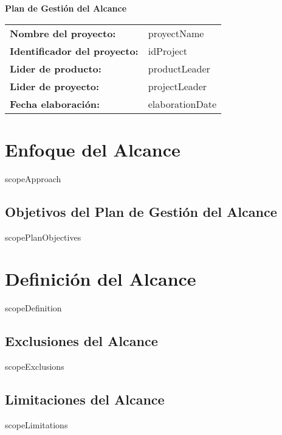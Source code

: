 \documentclass{article}
\begin{document}
    \begin{center}
    {\huge\textbf{Plan de Gestión del Alcance}}\\[14cm]
    \end{center}

    \newcommand{\wrappingmulticolumn}[3]
    {\multicolumn{#1}
    {|>{\hsize=\dimexpr#1\hsize+\tabcolsep * (2 * (#1 - 1) )+\arrayrulewidth* (#1 - 2)\relax}#2|}
    {#3}}
    \renewcommand{\arraystretch}{1.5} %

    \begin{tabularx}{\textwidth}{|>{\raggedright\arraybackslash}p{4cm}|>{\raggedright\arraybackslash}X|} \hline
    \rowcolor{gray!10}\textbf{Nombre del proyecto:} & {{proyectName}} \\[0.3cm]
    \textbf{Identificador del proyecto:} & {{idProject}} \\[0.3cm]
    \textbf{Lider de producto:} & {{productLeader}} \\[0.3cm]
    \textbf{Lider de proyecto:} & {{projectLeader}} \\[0.3cm]
    \textbf{Fecha elaboración:} & {{elaborationDate}} \\ \hline
    \end{tabularx}

    \newpage

    \tableofcontents
    \newpage

    \section{Enfoque del Alcance}
    {{scopeApproach}}
    \subsection{Objetivos del Plan de Gestión del Alcance}
    {{scopePlanObjectives}}

    \section{Definición del Alcance}
    {{scopeDefinition}}
    \subsection{Exclusiones del Alcance}
    {{scopeExclusions}}
    \subsection{Limitaciones del Alcance}
    {{scopeLimitations}}
\end{document}
